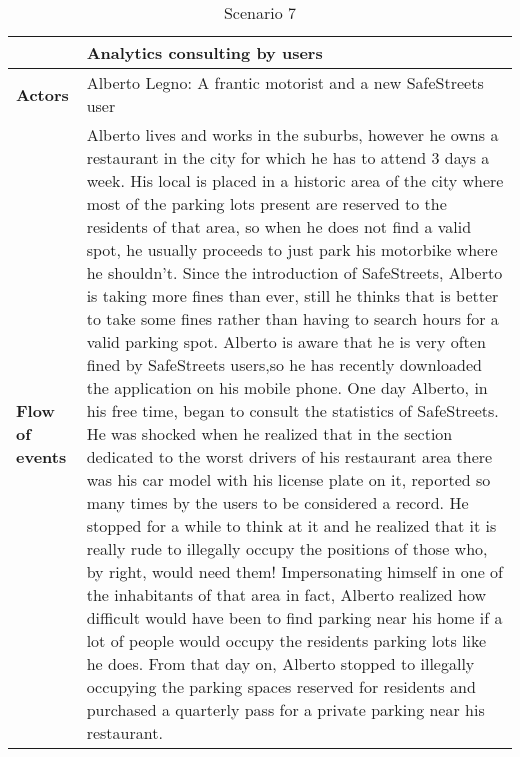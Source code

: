 \begin{table}[!htbp]
	\centering
\begin{tabular}{lp{9.8cm}}
\hline
\bf\large  &\bf\large Analytics consulting by users\\
\hline
\hline

\bf Actors&Alberto Legno: A frantic motorist and a new SafeStreets user\\
\hline
\bf Flow of events&
Alberto lives and works in the suburbs, however he owns a restaurant in the city for which he has to attend 3 days a week.
His local is placed in a historic area of the city where most of the parking lots present are reserved to the residents of that area, so when he does not find a valid spot, he usually proceeds to just park his motorbike where he shouldn't.
Since the introduction of SafeStreets, Alberto is taking more fines than ever, still he thinks that is better to take some fines rather than having to search hours for a valid parking spot.
Alberto is aware that he is very often fined by SafeStreets users,so he has recently downloaded the application on his mobile phone. One day Alberto, in his free time, began to consult the statistics of SafeStreets. He was shocked when he realized that in the section dedicated to the worst drivers of his restaurant area there was his car model with his license plate on it, reported so many times by the users to be considered a record.
He stopped for a while to think at it and he realized that it is really rude to illegally occupy the positions of those who, by right, would need them! Impersonating himself in one of the inhabitants of that area in fact, Alberto realized how difficult would have been to find parking near his home if a lot of people would occupy the residents parking lots like he does.
From that day on, Alberto stopped to illegally occupying the parking spaces reserved for residents and purchased a quarterly pass for a private parking near his restaurant.
\end{tabular}
\caption{Scenario 7} 
\label{tab:scenarioseven}
\end{table}
